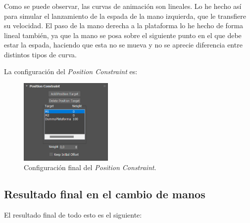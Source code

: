 Como se puede observar, las curvas de animación son lineales. Lo he hecho así para simular el lanzamiento de la espada de la mano izquierda, que le transfiere su velocidad. El paso de la mano derecha a la plataforma lo he hecho de forma lineal también, ya que la mano se posa sobre el siguiente punto en el que debe estar la espada, haciendo que esta no se mueva y no se aprecie diferencia entre distintos tipos de curva.

\bigskip

La configuración del \textit{Position Constraint} es:

\begin{figure}[H]
   \centering
   \includegraphics[width=0.4\textwidth]{imagenes/espada/PCconfig.png}
   \caption{Configuración final del \textit{Position Constraint}.}
\end{figure}

\subsection{Resultado final en el cambio de manos}

El resultado final de todo esto es el siguiente:


